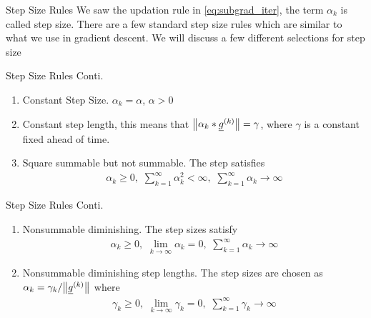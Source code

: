 \documentclass{beamer}
\renewcommand{\vec}[1]{\underline{#1}}
\begin{document}
\begin{frame}{Step Size Rules}
    We saw the updation rule in \eqref{eq:subgrad_iter}, the term $\alpha_k$ is called step size. There are a few standard step size rules which are similar to what we use in gradient descent. We will discuss a few different selections for step size
\end{frame}
\begin{frame}{Step Size Rules Conti.}
    \begin{enumerate}
        \item Constant Step Size. $\alpha_k = \alpha$, $\alpha>0$
        \item Constant step length, this means that $\norm{\alpha_k*\vec{g}^{(k)}} = \gamma$, where $\gamma$ is a constant fixed ahead of time.
        \item Square summable but not summable. The step satisfies 
        \begin{align}
            \displaystyle\alpha_k\geq 0,\,\, \sum_{k=1}^\infty \alpha_k^2 < \infty,\,\, \sum_{k=1}^\infty \alpha_k \to \infty
        \end{align}
    \end{enumerate}
\end{frame}
\begin{frame}{Step Size Rules Conti.}
    \begin{enumerate}[4]
        \item Nonsummable diminishing. The step sizes satisfy
        \begin{align}
            \displaystyle \alpha_k \geq 0,\,\, \lim_{k \to \infty} \alpha_k = 0,\,\, \sum_{k=1}^\infty \alpha_k \to \infty
        \end{align}
        \item Nonsummable diminishing step lengths. The step sizes are chosen as $\alpha_k = \gamma_k /\norm{\vec{g}^{(k)}}$ where
        \begin{align}
            \displaystyle \gamma_k \geq 0,\,\, \lim_{k \to \infty} \gamma_k = 0,\,\, \sum_{k=1}^\infty \gamma_k \to \infty
        \end{align}
    \end{enumerate}
\end{frame}
\end{document}
